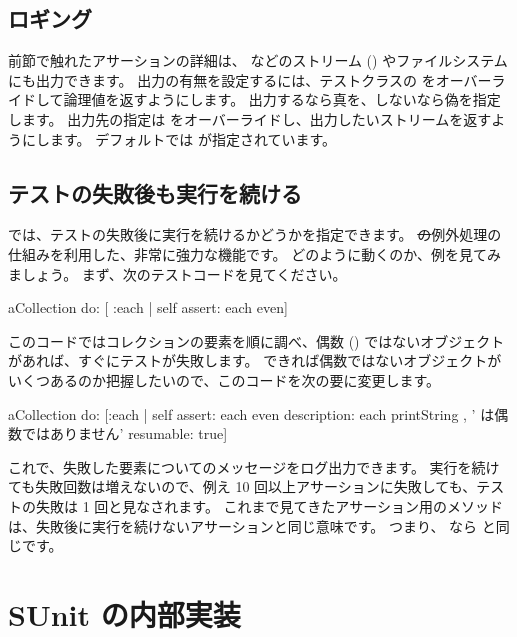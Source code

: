 \documentclass[a4paper,10pt,twoside]{book}
\begin{document}
\subsection{ロギング}

前節で触れたアサーションの詳細は、  などのストリーム () やファイルシステムにも出力できます。
出力の有無を設定するには、テストクラスの  をオーバーライドして論理値を返すようにします。
出力するなら真を、しないなら偽を指定します。
出力先の指定は  をオーバーライドし、出力したいストリームを返すようにします。
デフォルトでは  が指定されています。

\subsection{テストの失敗後も実行を続ける}

\sunit では、テストの失敗後に実行を続けるかどうかを指定できます。
\st の例外処理の仕組みを利用した、非常に強力な機能です。
どのように動くのか、例を見てみましょう。
まず、次のテストコードを見てください。

\begin{code}{}
aCollection do: [ :each | self assert: each even]
\end{code}

このコードではコレクションの要素を順に調べ、偶数 () ではないオブジェクトがあれば、すぐにテストが失敗します。
できれば偶数ではないオブジェクトがいくつあるのか把握したいので、このコードを次の要に変更します。

\begin{code}{}
aCollection do:
	[:each |
	self
		assert: each even
		description: each printString , ' は偶数ではありません'
		resumable: true]
\end{code}

これで、失敗した要素についてのメッセージをログ出力できます。
実行を続けても失敗回数は増えないので、例え 10 回以上アサーションに失敗しても、テストの失敗は 1 回と見なされます。
これまで見てきたアサーション用のメソッドは、失敗後に実行を続けないアサーションと同じ意味です。
つまり、  なら  と同じです。


\section{SUnit の内部実装}
\end{document}
